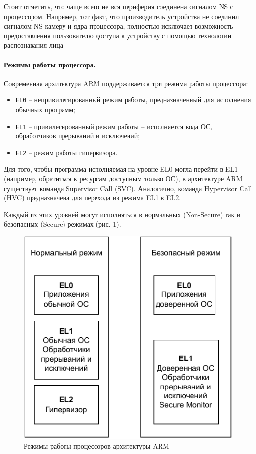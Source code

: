 Стоит отметить, что чаще всего не вся периферия соединена сигналом NS с процессором. Например, тот факт, что производитель устройства не соединил сигналом NS камеру и ядра процессора, полностью исключает возможность предоставления пользователю доступа к устройству с помощью технологии распознавания лица.

\paragraph{Режимы работы процессора.}

Современная архитектура ARM поддерживается три режима работы процессора: 

\begin{itemize}
	\item \texttt{EL0} -- непривилегированный режим работы, предназначенный для исполнения обычных программ;
	\item \texttt{EL1} -- привилегированный режим работы -- исполняется кода ОС, обработчиков прерываний и исключений;
	\item \texttt{EL2} -- режим работы гипервизора.
\end{itemize}

Для того, чтобы программа исполняемая на уровне EL0 могла перейти в EL1 (например, обратиться к ресурсам доступным только ОС), в архитектуре ARM существует команда Supervisor Call (SVC). Аналогично, команда Hypervisor Call (HVC) предназначена для перехода из режима EL1 в EL2.

Каждый из этих уровней могут исполняться в нормальных (Non-Secure) так и безопасных (Secure) режимах (рис. \ref{fig:arm-levels}).

\begin{figure}[h]
	\centering
	\includegraphics[width=\textwidth]{img/arm-levels.pdf}
	\caption{Режимы работы процессоров архитектуры ARM}
	\label{fig:arm-levels}
\end{figure}

